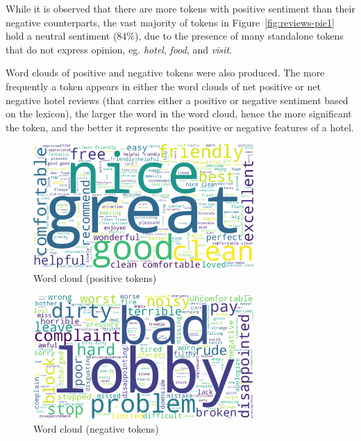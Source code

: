 \documentclass[12pt, bibliography=totocnumbered, a4paper]{scrartcl}
\def\it#1{\textit{#1}}
\begin{document}
While it is observed that there are more tokens with positive sentiment than
their negative counterparts, the vast majority of tokens in
Figure~\ref{fig:reviews-pie1} hold a neutral sentiment (\(84\%\)),
due to the presence of many standalone tokens that do not express opinion,
eg. \it{hotel}, \it{food}, and \it{visit}.

Word clouds of positive and negative tokens were also produced.
The more frequently a token appears in either the word clouds of
net positive or net negative hotel reviews (that carries either a positive
or negative sentiment based on the lexicon), the larger the word in the word cloud,
hence the more significant the token, and the better it represents the positive
or negative features of a hotel.

\begin{figure}[htpb]
	\begin{center}
		\includegraphics[width=0.75\textwidth]{../results/rq1/wordcloud_pos.png}
	\end{center}
	\caption{Word cloud (positive tokens)}
	\label{fig:wordcloud-pos}
\end{figure}

\begin{figure}[htpb]
	\begin{center}
		\includegraphics[width=0.75\textwidth]{../results/rq1/wordcloud_neg.png}
	\end{center}
	\caption{Word cloud (negative tokens)}
	\label{fig:wordcloud-neg}
\end{figure}
\end{document}
